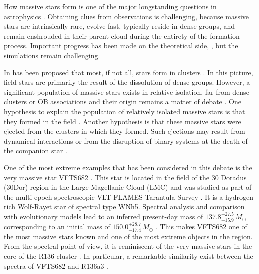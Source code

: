 \documentclass[a4paper,fleqn,usenatbib]{mnras}
\newcommand{\Msun}{{\,\mathrm{M}_\odot}}
\begin{document}
How massive stars form is one of the major longstanding questions in astrophysics
\citep[e.g.,][]{zinnecker:07}. %
%
Obtaining clues from observations is challenging, because massive stars are intrinsically rare, 
evolve fast, typically reside in dense groups, and remain enshrouded in
their parent cloud during the entirety of the formation
process. Important progress has been made on the theoretical side,
\citep[e.g.][]{bate:09,kuiper:15,rosen:16}, but the simulations %
remain challenging.  

In has been proposed that most, if not all, stars form in clusters
\citep[and references therein]{lada:03}. In this picture, field stars are primarily the result
of the dissolution of dense groups.  However, a significant population
of massive stars exists in relative isolation, far from dense clusters
or OB associations and their origin remains a matter of debate
\citep{gvaramadze:12, lamb:16,ward:18}. One hypothesis to explain
the population of relatively isolated massive stars is that they
formed in the field \citep[e.g.,][]{parker:07}. Another
hypothesis is that these massive stars were ejected from the clusters
in which they formed. Such ejections may result from dynamical interactions \citep[e.g.,][]{poveda:67} or from the disruption of binary systems at the death of the companion  star \citep[e.g.,][]{blaauw:61, renzo:18}. 

\vspace*{-9pt}
One of the most extreme examples that has been considered in this
debate is the very massive star VFTS682  \citep[][]{bestenlehner:11,
  bressert:12}. This star is located in the field of the 30 Doradus
(30Dor) region in the Large Magellanic Cloud (LMC) and was studied as part of the multi-epoch spectroscopic VLT-FLAMES Tarantula Survey \citep[VFTS,][]{evans:11}. It is a hydrogen-rich Wolf-Rayet star of spectral type WNh5. Spectral analysis and comparison with evolutionary models lead to an inferred present-day mass of $137.8^{+27.5}_{-15.9}\,M_\odot$ corresponding to an initial mass of $150.0^{+28.7}_{-17.4}\,M_\odot$
\citep{schneider:18}. 
This makes VFTS682 one of the most massive stars known and one of the most extreme objects in the region.
From the spectral point of view, it is reminiscent of the very
massive stars in the core of the R136 cluster \citep{dekoter:97,crowther:10, crowther:16}. 
In particular, a remarkable similarity exist between the
spectra of VFTS682 and R136a3 \citep{rubio-diez:17}.%
\end{document}
